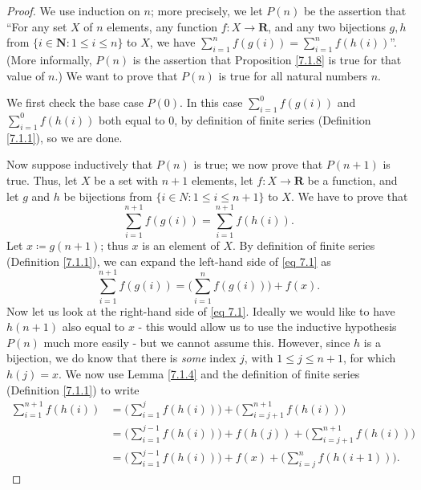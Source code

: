 \begin{proof}
    We use induction on \(n\);
    more precisely, we let \(P(n)\) be the assertion that ``For any set \(X\) of \(n\) elements, any function \(f : X \to \mathbf{R}\), and any two bijections \(g, h\) from \(\{i \in \mathbf{N} : 1 \leq i \leq n\}\) to \(X\), we have \(\sum_{i = 1}^n f(g(i)) = \sum_{i = 1}^n f(h(i))\)''.
    (More informally, \(P(n)\) is the assertion that Proposition \ref{7.1.8} is true for that value of \(n\).)
    We want to prove that \(P(n)\) is true for all natural numbers \(n\).

    We first check the base case \(P(0)\).
    In this case \(\sum_{i = 1}^0 f(g(i))\) and \(\sum_{i = 1}^0 f(h(i))\) both equal to \(0\), by definition of finite series (Definition \ref{7.1.1}), so we are done.

    Now suppose inductively that \(P(n)\) is true;
    we now prove that \(P(n + 1)\) is true.
    Thus, let \(X\) be a set with \(n + 1\) elements, let \(f : X \to \mathbf{R}\) be a function, and let \(g\) and \(h\) be bijections from \(\{i \in N : 1 \leq i \leq n + 1\}\) to \(X\).
    We have to prove that
    \[
        \sum_{i = 1}^{n + 1} f(g(i)) = \sum_{i = 1}^{n + 1} f(h(i)). \tag{7.1}\label{eq 7.1}
    \]
    Let \(x \coloneqq g(n + 1)\);
    thus \(x\) is an element of \(X\).
    By definition of finite series (Definition \ref{7.1.1}), we can expand the left-hand side of \eqref{eq 7.1} as
    \[
        \sum_{i = 1}^{n + 1} f(g(i)) = \Bigg(\sum_{i = 1}^n f(g(i))\Bigg) + f(x).
    \]
    Now let us look at the right-hand side of \eqref{eq 7.1}.
    Ideally we would like to have \(h(n + 1)\) also equal to \(x\)
    - this would allow us to use the inductive hypothesis \(P(n)\) much more easily
    - but we cannot assume this.
    However, since \(h\) is a bijection, we do know that there is \emph{some} index \(j\), with \(1 \leq j \leq n + 1\), for which \(h(j) = x\).
    We now use Lemma \ref{7.1.4} and the definition of finite series (Definition \ref{7.1.1}) to write
    \begin{align*}
        \sum_{i = 1}^{n + 1} f(h(i)) & = \Bigg(\sum_{i = 1}^j f(h(i))\Bigg) + \Bigg(\sum_{i = j + 1}^{n + 1} f(h(i))\Bigg)                 \\
                                     & = \Bigg(\sum_{i = 1}^{j - 1} f(h(i))\Bigg) + f(h(j)) + \Bigg(\sum_{i = j + 1}^{n + 1} f(h(i))\Bigg) \\
                                     & = \Bigg(\sum_{i = 1}^{j - 1} f(h(i))\Bigg) + f(x) + \Bigg(\sum_{i = j}^n f(h(i + 1))\Bigg).

\end{align*}
\end{proof}
